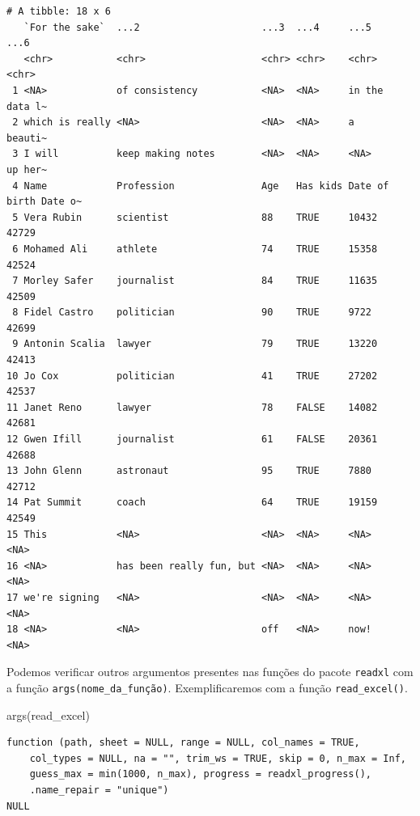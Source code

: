 \documentclass[
  brazilian,
]{book}
\newenvironment{Shaded}{\begin{snugshade}}{\end{snugshade}}
\newcommand{\FunctionTok}[1]{\textcolor[rgb]{0.00,0.00,0.00}{#1}}
\newcommand{\NormalTok}[1]{#1}
\begin{document}
\begin{verbatim}
# A tibble: 18 x 6
   `For the sake`  ...2                     ...3  ...4     ...5          ...6   
   <chr>           <chr>                    <chr> <chr>    <chr>         <chr>  
 1 <NA>            of consistency           <NA>  <NA>     in the        data l~
 2 which is really <NA>                     <NA>  <NA>     a             beauti~
 3 I will          keep making notes        <NA>  <NA>     <NA>          up her~
 4 Name            Profession               Age   Has kids Date of birth Date o~
 5 Vera Rubin      scientist                88    TRUE     10432         42729  
 6 Mohamed Ali     athlete                  74    TRUE     15358         42524  
 7 Morley Safer    journalist               84    TRUE     11635         42509  
 8 Fidel Castro    politician               90    TRUE     9722          42699  
 9 Antonin Scalia  lawyer                   79    TRUE     13220         42413  
10 Jo Cox          politician               41    TRUE     27202         42537  
11 Janet Reno      lawyer                   78    FALSE    14082         42681  
12 Gwen Ifill      journalist               61    FALSE    20361         42688  
13 John Glenn      astronaut                95    TRUE     7880          42712  
14 Pat Summit      coach                    64    TRUE     19159         42549  
15 This            <NA>                     <NA>  <NA>     <NA>          <NA>   
16 <NA>            has been really fun, but <NA>  <NA>     <NA>          <NA>   
17 we're signing   <NA>                     <NA>  <NA>     <NA>          <NA>   
18 <NA>            <NA>                     off   <NA>     now!          <NA>   
\end{verbatim}

Podemos verificar outros argumentos presentes nas funções do pacote \texttt{readxl} com a função \texttt{args(nome\_da\_função)}. Exemplificaremos com a função \texttt{read\_excel()}.

\begin{Shaded}
\begin{Highlighting}[]
\FunctionTok{args}\NormalTok{(read\_excel)}
\end{Highlighting}
\end{Shaded}

\begin{verbatim}
function (path, sheet = NULL, range = NULL, col_names = TRUE, 
    col_types = NULL, na = "", trim_ws = TRUE, skip = 0, n_max = Inf, 
    guess_max = min(1000, n_max), progress = readxl_progress(), 
    .name_repair = "unique") 
NULL
\end{verbatim}
\end{document}
